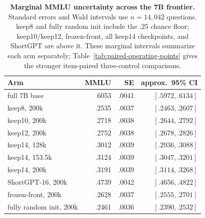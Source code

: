 \begin{table}[t]
\centering
\scriptsize
\setlength{\tabcolsep}{3pt}
\begin{tabular}{@{}lrrr@{}}
\toprule
\textbf{Arm} & \textbf{MMLU} & \textbf{SE} & \textbf{approx.\ 95\% CI} \\
\midrule
full 7B base & .6053 & .0041 & $[.5972,.6134]$ \\
keep8, 200k & .2535 & .0037 & $[.2463,.2607]$ \\
keep10, 200k & .2718 & .0038 & $[.2644,.2792]$ \\
keep12, 200k & .2752 & .0038 & $[.2678,.2826]$ \\
keep14, 128k & .3012 & .0039 & $[.2936,.3088]$ \\
keep14, 153.5k & .3124 & .0039 & $[.3047,.3201]$ \\
keep14, 200k & .3191 & .0039 & $[.3114,.3268]$ \\
ShortGPT-16, 200k & .4739 & .0042 & $[.4656,.4822]$ \\
frozen-front, 200k & .2628 & .0037 & $[.2555,.2701]$ \\
fully random init, 200k & .2461 & .0036 & $[.2390,.2532]$ \\
\bottomrule
\end{tabular}
\caption{\textbf{Marginal MMLU uncertainty across the 7B frontier.} Standard
errors and Wald intervals use $n=14{,}042$ questions. keep8 and
fully random init include the $.25$ chance floor; keep10/keep12,
frozen-front, all keep14 checkpoints, and ShortGPT are above it. These marginal intervals summarize each
arm separately; Table~\ref{tab:paired-operating-points} gives the stronger item-paired
three-control comparisons.}
\label{tab:app-mmlu-ci}
\end{table}
